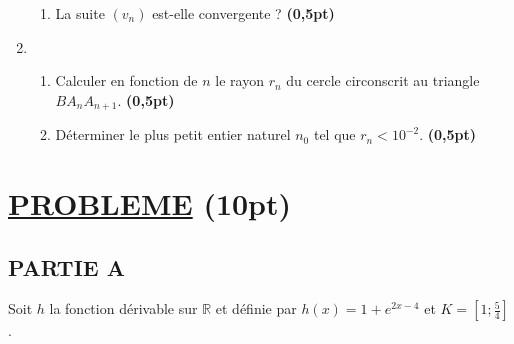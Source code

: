 \documentclass[12pt]{article}
\begin{document}
\begin{enumerate}
\begin{enumerate}
        \item La suite \( (v_n) \) est-elle convergente ? \hfill \textbf{(0,5pt)}
    \end{enumerate}
    
    \item 
    \begin{enumerate}
        \item Calculer en fonction de \( n \) le rayon \( r_n \) du cercle circonscrit au triangle \( B A_n A_{n+1} \). \hfill \textbf{(0,5pt)}
        
        \item Déterminer le plus petit entier naturel \( n_0 \) tel que \( r_n < 10^{-2} \). \hfill \textbf{(0,5pt)}
    \end{enumerate}
\end{enumerate}


\section*{\underline{PROBLEME} \hfill (10pt)}

\subsection*{PARTIE A}

Soit \( h \) la fonction dérivable sur \( \mathbb{R} \) et définie par \( h(x) = 1 + e^{2x - 4} \) et \( K = \left[1 ; \frac{5}{4} \right] \).
\end{document}
